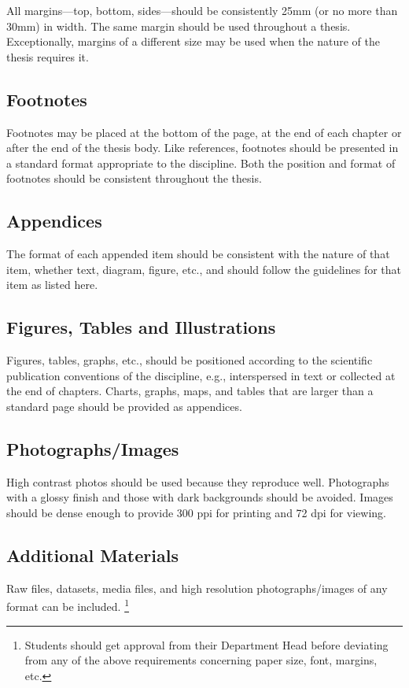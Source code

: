 All margins---top, bottom, sides---should be consistently 25mm (or no more than 30mm) in width. The same margin should be used throughout a thesis. Exceptionally, margins of a different size may be used when the nature of the thesis requires it.

\subsection{Footnotes}
Footnotes may be placed at the bottom of the page, at the end of each chapter or after the end of the thesis body. Like references, footnotes should be presented in a standard format appropriate to the discipline. Both the position and format of footnotes should be consistent throughout the thesis.

\subsection{Appendices}
The format of each appended item should be consistent with the nature of that item, whether text, diagram, figure, etc., and should follow the guidelines for that item as listed here.

\subsection{Figures, Tables and Illustrations}
Figures, tables, graphs, etc., should be positioned according to the scientific publication conventions of the discipline, e.g., interspersed in text or collected at the end of chapters. Charts, graphs, maps, and tables that are larger than a standard page should be provided as appendices.

\subsection{Photographs/Images}
High contrast photos should be used because they reproduce well. Photographs with a glossy finish and those with dark backgrounds should be avoided. Images should be dense enough to provide 300 ppi for printing and 72 dpi for viewing.

\subsection{Additional Materials}
Raw files, datasets, media files, and high resolution photographs/images of any format can be included. \footnote{Students should get approval from their Department Head before deviating from any of the above requirements concerning paper size, font, margins, etc.}

